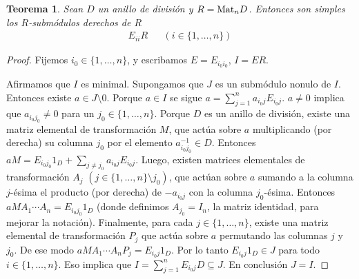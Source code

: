 \documentclass{report}
\newcommand{\Mat}{\textnormal{Mat}}
\newtheorem{theorem}{Teorema}
\begin{document}
  \begin{theorem}
    Sean \(D\) un anillo de división y \(R = \Mat_n D\).
    Entonces son simples los \(R\)-submódulos derechos de \(R\)
    \begin{align}
      E_{i i} R
      &&(i \in \{1, \dots, n\})
    \end{align}
  \end{theorem}
  \begin{proof}
    Fijemos \(i_0 \in \{1, \dots, n\}\), y escribamos \(E = E_{i_0 i_0}\), \(I = E R\).

    Afirmamos que \(I\) es minimal.
    Supongamos que \(J\) es un submódulo nonulo de \(I\).
    Entonces existe \(a \in J \setminus 0\).
    Porque \(a \in I\) se sigue \(a = \sum_{j = 1}^n a_{i_0 j} E_{i_0 j}\).
    \(a \neq 0\) implica que \(a_{i_0 j_0} \neq 0\) para un \(j_0 \in \{1, \dots, n\}\).
    Porque \(D\) es un anillo de división, existe una matriz elemental de transformación \(M\), que actúa sobre \(a\) multiplicando (por derecha) su columna \(j_0\) por el elemento \(a_{i_0 j_0}^{- 1} \in D\).
    Entonces \(a M = E_{i_0 j_0} 1_D + \sum_{j \neq j_0} a_{i_0 j} E_{i_0 j}\).
    Luego, existen matrices elementales de transformación \(A_j\) \((j \in \{1, \dots, n\} \setminus j_0)\), que actúan sobre \(a\) sumando a la columna \(j\)-ésima el producto (por derecha) de \(- a_{i_0 j}\) con la columna \(j_0\)-ésima.
    Entonces \(a M A_1 \cdots A_n = E_{i_0 j_0} 1_D\) (donde definimos \(A_{j_0} = I_n\), la matriz identidad, para mejorar la notación).
    Finalmente, para cada \(j \in \{1, \dots, n\}\), existe una matriz elemental de transformación \(P_j\) que actúa sobre \(a\) permutando las columnas \(j\) y \(j_0\).
    De ese modo \(a M A_1 \cdots A_n P_j = E_{i_0 j} 1_D\).
    Por lo tanto \(E_{i_0 j} 1_D \in J\) para todo \(i \in \{1, \dots, n\}\).
    Eso implica que \(I = \sum_{j = 1}^n E_{i_0 j} D \subseteq J\).
    En conclusión \(J = I\).
  \end{proof}
\end{document}
